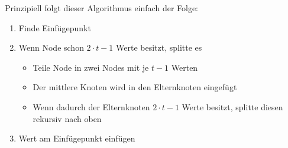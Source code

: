 \documentclass[
../AuD-Zusammenfassung.tex,
]
{subfiles}
\begin{document}
Prinzipiell folgt dieser Algorithmus einfach der Folge: 
\begin{enumerate}
    \item Finde Einfügepunkt
    \item Wenn Node schon $2 \cdot t -1 $ Werte besitzt, splitte es
    \begin{itemize}
        \item Teile Node in zwei Nodes mit je $ t - 1 $ Werten
        \item Der mittlere Knoten wird in den Elternknoten eingefügt
        \item Wenn dadurch der Elternknoten $2 \cdot t - 1 $ Werte besitzt, splitte diesen rekursiv nach oben 
    \end{itemize}
    \item Wert am Einfügepunkt einfügen
\end{enumerate}
\end{document}
